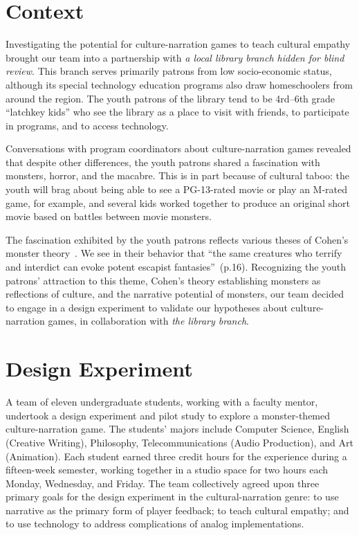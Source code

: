 \documentclass[a4paper]{article}
\begin{document}
\section{Context}

Investigating the potential for culture-narration games to teach
cultural empathy brought our team into a partnership with
\textit{a local library branch hidden for blind review}. This branch
serves primarily patrons from low socio-economic status, although
its special technology education programs also draw homeschoolers from
around the region.
The youth patrons of the library tend to be 4rd--6th grade 
``latchkey kids'' who 
see the library as a place to visit with friends, to participate in programs,
and to access technology.

Conversations with program coordinators about culture-narration games
revealed that despite other differences, the youth patrons shared
a fascination with monsters, horror, and the macabre. 
This is in part because of cultural taboo: the youth will brag about
being able to see a PG-13-rated movie or play an M-rated game,
for example, and several kids worked together to produce an original
short movie based on battles between movie monsters.

The fascination exhibited by the youth patrons reflects various theses
of Cohen's monster theory~\citep{Cohen1996}. 
We see in their behavior that ``the same creatures who terrify and
interdict can evoke potent escapist fantasies''~(p.16).
Recognizing the youth patrons' attraction to this theme,
Cohen's theory establishing monsters as reflections of culture,
and the narrative potential of monsters,
our team decided to engage in a design experiment to validate our
hypotheses about culture-narration games,
in collaboration with \textit{the library branch}.


\section{Design Experiment}

A team of eleven undergraduate students, working with a faculty mentor,
undertook a design experiment and pilot study to explore a monster-themed
culture-narration game.
The students' majors include Computer Science, English
(Creative Writing), Philosophy, Telecommunications (Audio Production),
and Art (Animation).
Each student earned three credit hours for the experience during a fifteen-week
semester,
working together in a studio space for two hours each Monday, Wednesday,
and Friday.
The team collectively agreed upon three primary goals for the design
experiment in the cultural-narration genre:
to use narrative as the primary form of player feedback;
to teach cultural empathy;
and to use technology to address complications of analog implementations.
\end{document}
